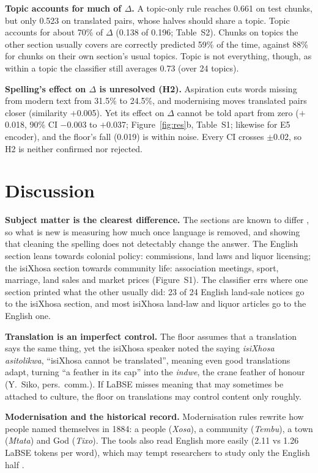 \documentclass[10pt,letterpaper]{article}
\begin{document}
\textbf{Topic accounts for much of $\Delta$.} A topic-only rule reaches 0.661 on test chunks, but only 0.523 on
translated pairs, whose halves should share a topic. Topic accounts for about 70\% of $\Delta$ (0.138 of 0.196; Table~S2).
Chunks on topics the other section usually covers are correctly predicted 59\% of the time, against 88\% for
chunks on their own section's usual topics. Topic is not everything, though, as within a topic the classifier still averages 0.73 (over 24 topics).

\textbf{Spelling's effect on $\Delta$ is unresolved (H2).} Aspiration cuts words
missing from modern text from 31.5\% to 24.5\%, and modernising moves translated pairs closer (similarity $+$0.005). Yet its effect on $\Delta$ cannot be told apart from zero ($+$0.018, 90\% CI $-$0.003 to
$+$0.037; Figure~\ref{fig:res}b, Table~S1; likewise for E5 encoder), and the floor's fall (0.019) is within noise. Every CI crosses $\pm$0.02, so H2 is neither confirmed nor rejected.

\section{Discussion}
\textbf{Subject matter is the clearest difference.} The sections are known to differ \citep{schoots}, so what
is new is measuring how much once language is removed, and showing that cleaning the spelling does not
detectably change the answer. The English section leans towards colonial policy: commissions, land laws
and liquor licensing; the isiXhosa section towards community life: association meetings, sport, marriage,
land sales and market prices (Figure~S1). The classifier errs where one section printed what the other
usually did: 23 of 24 English land-sale notices go to the isiXhosa section, and most isiXhosa land-law and
liquor articles go to the English one.

\textbf{Translation is an imperfect control.} The floor assumes that a translation says the same thing, yet the isiXhosa
speaker noted the saying \emph{isiXhosa asitolikwa}, ``isiXhosa
cannot be translated'', meaning even good translations adapt, turning ``a feather in its cap'' into the
\emph{indwe}, the crane feather of honour (Y.~Siko, pers.\ comm.). If LaBSE misses meaning that may sometimes be attached to culture, the floor on translations
may control content only roughly.

\textbf{Modernisation and the historical record.} Modernisation rules rewrite how people named themselves in 1884:
a people (\emph{Xosa}), a community (\emph{Tembu}), a town (\emph{Mtata}) and God (\emph{Tixo}). The tools
also read English more easily (2.11 vs 1.26 LaBSE tokens per word), which may tempt researchers to study only the English half \citep{nekoto}.
\end{document}
